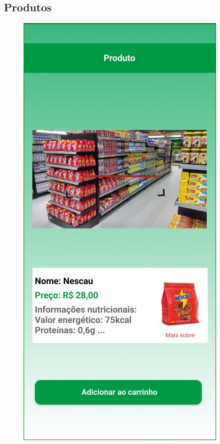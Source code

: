 \documentclass[12pt,oneside,a4paper,article]{abntex2}
\begin{document}
     \subsection{Produtos}
    \begin{figure}[H]
        \centering
        \includegraphics[width=0.5\linewidth]{imagens-template//telas/produto.jpg}
        \label{fig:placeholder}
    \end{figure}
    
\end{document}
